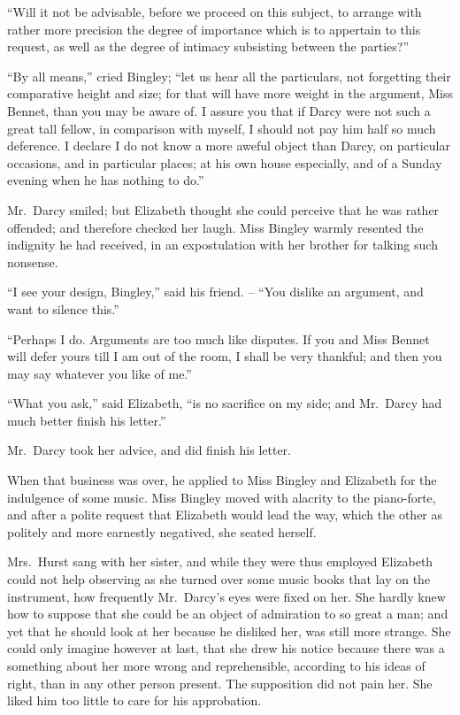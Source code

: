 “Will it not be advisable, before we proceed on this
subject, to arrange with rather more precision the degree
of importance which is to appertain to this request, as well
as the degree of intimacy subsisting between the parties?”

“By all means,” cried Bingley; “let us hear all the
particulars, not forgetting their comparative height and
size; for that will have more weight in the argument,
Miss Bennet, than you may be aware of. I assure you
that if Darcy were not such a great tall fellow, in comparison
with myself, I should not pay him half so much
deference. I declare I do not know a more aweful object
than Darcy, on particular occasions, and in particular
places; at his own house especially, and of a Sunday
evening when he has nothing to do.”

Mr.\ Darcy smiled; but Elizabeth thought she could
perceive that he was rather offended; and therefore
checked her laugh. Miss Bingley warmly resented the
indignity he had received, in an expostulation with her
brother for talking such nonsense.

“I see your design, Bingley,” said his friend. -- “You
dislike an argument, and want to silence this.”

“Perhaps I do. Arguments are too much like disputes.
If you and Miss Bennet will defer yours till I am out of
the room, I shall be very thankful; and then you may
say whatever you like of me.”

“What you ask,” said Elizabeth, “is no sacrifice on
my side; and Mr.\ Darcy had much better finish his letter.”

Mr.\ Darcy took her advice, and did finish his letter.

When that business was over, he applied to Miss Bingley
and Elizabeth for the indulgence of some music. Miss
Bingley moved with alacrity to the piano-forte, and after
a polite request that Elizabeth would lead the way, which
the other as politely and more earnestly negatived, she
seated herself.

Mrs.\ Hurst sang with her sister, and while they were
thus employed Elizabeth could not help observing as she
turned over some music books that lay on the instrument,
how frequently Mr.\ Darcy’s eyes were fixed on her. She
hardly knew how to suppose that she could be an object
of admiration to so great a man; and yet that he should
look at her because he disliked her, was still more strange.
She could only imagine however at last, that she drew
his notice because there was a something about her more
wrong and reprehensible, according to his ideas of right,
than in any other person present. The supposition did
not pain her. She liked him too little to care for his
approbation.

